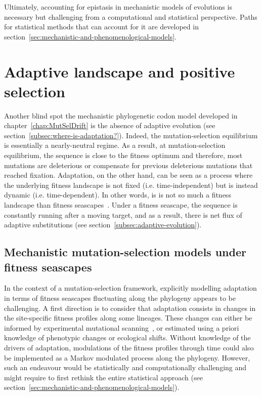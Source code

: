 Ultimately, accounting for epistasis in mechanistic models of evolutions is necessary but challenging from a computational and statistical perspective.
Paths for statistical methods that can account for it are developed in section~\ref{sec:mechanistic-and-phenomenological-models}.

\section{Adaptive landscape and positive selection}
\label{sec:adaptative-landscape}

Another blind spot the mechanistic phylogenetic codon model developed in chapter~\ref{chap:MutSelDrift} is the absence of adaptive evolution (see section~\ref{subsec:where-is-adaptation?}).
Indeed, the mutation-selection equilibrium is essentially a nearly-neutral regime.
As a result, at mutation-selection equilibrium, the sequence is close to the fitness optimum and therefore, most mutations are deleterious or compensate for previous deleterious mutations that reached fixation.
Adaptation, on the other hand, can be seen as a process where the underlying fitness landscape is not fixed (i.e. time-independent) but is instead dynamic (i.e. time-dependent).
In other words, is is not so much a fitness landscape than fitness seascapes~\citep{Mustonen2009}.
Under a fitness seascape, the sequence is constantly running after a moving target, and as a result, there is net flux of adaptive substitutions (see section~\ref{subsec:adaptive-evolution}).

\subsection{Mechanistic mutation-selection models under fitness seascapes}
\label{subsec:mechanistic-fluctuating-selection}

In the context of a mutation-selection framework, explicitly modelling adaptation in terms of fitness seascapes fluctuating along the phylogeny appears to be challenging.
A first direction is to consider that adaptation consists in changes in the site-specific fitness profiles along some lineages.
These changes can either be informed by experimental mutational scanning~\citep{Bloom2017}, or estimated using a priori knowledge of phenotypic changes or ecological shifts\citep{Tamuri2009, Parto2018, Parto2018a}.
Without knowledge of the drivers of adaptation, modulations of the fitness profiles through time could also be implemented as a Markov modulated process along the phylogeny.
However, such an endeavour would be statistically and computationally challenging and might require to first rethink the entire statistical approach (see section~\ref{sec:mechanistic-and-phenomenological-models}).

